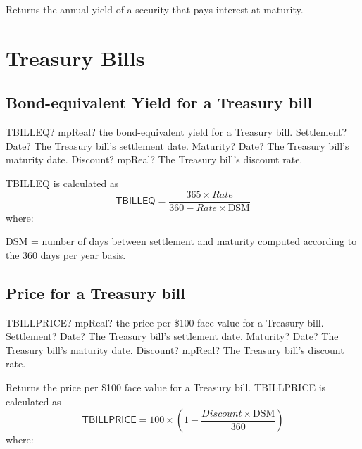 \vspace{0.3cm}
Returns the annual yield of a security that pays interest at maturity.














\newpage
\section{Treasury  Bills}

\subsection{Bond-equivalent Yield for a Treasury bill}


\begin{mpFunctionsExtract}
	\mpWorksheetFunctionThreeNotImplemented
	{TBILLEQ? mpReal? the bond-equivalent yield for a Treasury bill.}
	{Settlement? Date?  The Treasury bill's settlement date.}
	{Maturity? Date? The Treasury bill's maturity date.}
	{Discount? mpReal? The Treasury bill's discount rate.}
\end{mpFunctionsExtract}


\vspace{0.3cm}
TBILLEQ is calculated as
\begin{equation}
	\textsf{TBILLEQ} = \frac{365 \times Rate}{360- Rate \times \text{DSM}} 
\end{equation}
where:

DSM  = number of days between settlement and maturity computed according to the 360 days per year basis.



\subsection{Price for a Treasury bill}

\begin{mpFunctionsExtract}
	\mpWorksheetFunctionThreeNotImplemented
	{TBILLPRICE? mpReal? the price per \$100 face value for a Treasury bill.}
	{Settlement? Date?  The Treasury bill's settlement date.}
	{Maturity? Date? The Treasury bill's maturity date.}
	{Discount? mpReal? The Treasury bill's discount rate.}
\end{mpFunctionsExtract}

\vspace{0.3cm}
Returns the price per \$100 face value for a Treasury bill. TBILLPRICE is calculated as
\begin{equation}
	\textsf{TBILLPRICE} = 100 \times \left(1- \frac{Discount \times\text{DSM}}{360} \right)
\end{equation}
where:


